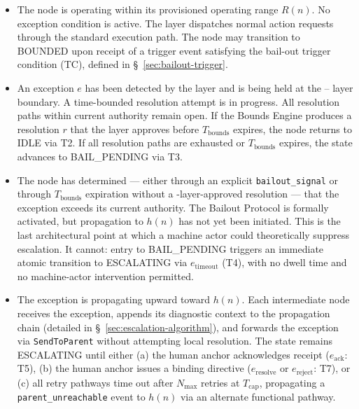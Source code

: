 \begin{itemize}\itemsep=0pt
\item[\textbf{IDLE.}] The node is operating within its provisioned operating range $R(n)$. No exception condition is active. The \fact{} layer dispatches normal action requests through the standard execution path. The node may transition to BOUNDED upon receipt of a trigger event satisfying the bail-out trigger condition (TC), defined in \S~\ref{sec:bailout-trigger}.

\item[\textbf{BOUNDED.}] An exception $e$ has been detected by the \bounds{} layer and is being held at the \bounds{}--\fact{} layer boundary. A time-bounded resolution attempt is in progress. All resolution paths within current authority remain open. If the Bounds Engine produces a resolution $r$ that the \fact{} layer approves before $T_{\text{bounds}}$ expires, the node returns to IDLE via T2. If all resolution paths are exhausted or $T_{\text{bounds}}$ expires, the state advances to BAIL\_PENDING via T3.

\item[\textbf{BAIL\_PENDING.}] The node has determined — either through an explicit \texttt{bailout\_signal} or through $T_{\text{bounds}}$ expiration without a \fact-layer-approved resolution — that the exception exceeds its current authority. The Bailout Protocol is formally activated, but propagation to $h(n)$ has not yet been initiated. This is the last architectural point at which a machine actor could theoretically suppress escalation. It cannot: entry to BAIL\_PENDING triggers an immediate atomic transition to ESCALATING via $e_{\text{timeout}}$ (T4), with no dwell time and no machine-actor intervention permitted.

\item[\textbf{ESCALATING.}] The exception is propagating upward toward $h(n)$. Each intermediate node receives the exception, appends its diagnostic context to the propagation chain (detailed in \S~\ref{sec:escalation-algorithm}), and forwards the exception via \texttt{SendToParent} without attempting local resolution. The state remains ESCALATING until either (a) the human anchor acknowledges receipt ($e_{\text{ack}}$: T5), (b) the human anchor issues a binding directive ($e_{\text{resolve}}$ or $e_{\text{reject}}$: T7), or (c) all retry pathways time out after $N_{\max}$ retries at $T_{\text{cap}}$, propagating a \texttt{parent\_unreachable} event to $h(n)$ via an alternate functional pathway.


\end{itemize}
